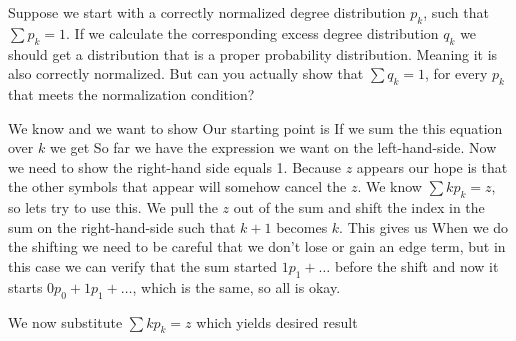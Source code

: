 Suppose we start with a correctly normalized degree distribution $p_k$, such that $\sum p_k=1$. If we calculate the corresponding excess degree distribution $q_k$ we should get a distribution that is a proper probability distribution. Meaning it is also correctly normalized. But can you actually show that $\sum q_k=1$, for every $p_k$ that meets the normalization condition? 

\solution
We know 
and we want to show
Our starting point is 
If we sum the this equation over $k$ we get 
So far we have the expression we want on the left-hand-side. Now we need to show the right-hand side equals 1. Because $z$ appears our hope is that the other symbols that appear will somehow cancel the $z$. We know $\sum kp_k=z$, so lets try to use this. We pull the $z$ out of the sum and shift the index in the sum on the right-hand-side such that $k+1$ becomes $k$. This gives us
When we do the shifting we need to be careful that we don't lose or gain an edge term, but in this case we can verify that the sum started $1p_1+\ldots$ before the shift and now it starts $0p_0+1p_1+\ldots$, which is the same, so all is okay. 

We now substitute $\sum kp_k=z$ which yields desired result
